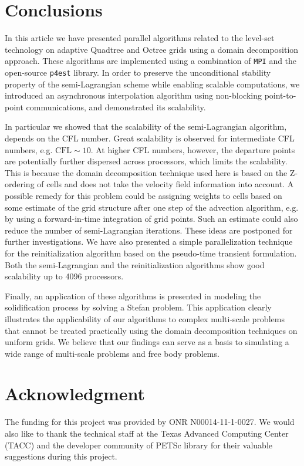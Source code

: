 \section{Conclusions}
In this article we have presented parallel algorithms related to the level-set technology on adaptive Quadtree and Octree grids using a domain decomposition approach. These algorithms are implemented using a combination of \texttt{MPI} and the open-source \texttt{p4est} library. In order to preserve the unconditional stability property of the semi-Lagrangian scheme while enabling scalable computations, we introduced an asynchronous interpolation algorithm using non-blocking point-to-point communications, and demonstrated its scalability. 

In particular we showed that the scalability of the semi-Lagrangian algorithm, depends on the CFL number. Great scalability is observed for intermediate CFL numbers, e.g. $\text{CFL}\sim10$. At higher CFL numbers, however, the departure points are potentially further dispersed across processors, which limits the scalability. This is because the domain decomposition technique used here is based on the Z-ordering of cells and does not take the velocity field information into account. A possible remedy for this problem could be assigning weights to cells based on some estimate of the grid structure after one step of the advection algorithm, e.g. by using a forward-in-time integration of grid points. Such an estimate could also reduce the number of semi-Lagrangian iterations. These ideas are postponed for further investigations. We have also presented a simple parallelization technique for the reinitialization algorithm based on the pseudo-time transient formulation. Both the semi-Lagrangian and the reinitialization algorithms show good scalability up to 4096 processors. 

Finally, an application of these algorithms is presented in modeling the solidification process by solving a Stefan problem. This application clearly illustrates the applicability of our algorithms to complex multi-scale problems that cannot be treated practically using the domain decomposition techniques on uniform grids. We believe that our findings can serve as a basis to simulating a wide range of multi-scale problems and free body problems.

\section*{Acknowledgment} 
The funding for this project was provided by ONR N00014-11-1-0027. We would also like to thank the technical staff at the Texas Advanced Computing Center (TACC) and the developer community of PETSc library for their valuable suggestions during this project.